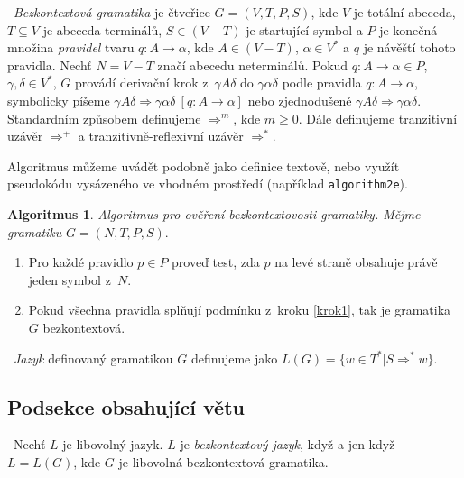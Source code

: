 \documentclass[a4paper,11pt,twocolumn]{article}[2014-03-27]
\begin{document}
\begin{definice} \label{definice1.1} \  \emph{Bezkontextová gramatika} je čtveřice $G=(V,T,P,S)$, kde $V$ je totální abeceda, $T \subseteq V$ je abeceda terminálů, $S \in (V-T)$ je startující symbol a $P$ je konečná množina \emph{pravidel}
tvaru $q\colon A \rightarrow \alpha$, kde $A \in (V - T) $, $\alpha \in V^*$ a $q$ je návěští tohoto pravidla. Nechť $N = V - T$ značí abecedu neterminálů.
Pokud $q\colon A \rightarrow \alpha \in P$, $\gamma, \delta \in V^*$, $G$ provádí derivační krok z~$\gamma A \delta$ do $\gamma \alpha \delta$ podle pravidla $q\colon A \rightarrow \alpha$, symbolicky píšeme $\gamma A \delta \Rightarrow \gamma \alpha \delta \ [q\colon A \rightarrow \alpha]$ nebo zjednodušeně $\gamma A \delta \Rightarrow \gamma \alpha \delta$. Standardním způsobem definujeme $\Rightarrow^m$, kde $m \geq 0 $. Dále definujeme
tranzitivní uzávěr $\Rightarrow^+$ a tranzitivně-reflexivní uzávěr $\Rightarrow^*$.
\end{definice}

Algoritmus můžeme uvádět podobně jako definice textově, nebo využít pseudokódu vysázeného ve vhodném prostředí (například \texttt{algorithm2e}).

\theoremstyle{definition}
\newtheorem{algoritmus}[definice]{Algoritmus}

\begin{algoritmus}
\textit{Algoritmus pro ověření bezkontextovosti gramatiky. Mějme gramatiku} $G = (N, T, P, S)$.
\begin{enumerate}
\itshape \item \label{krok1} Pro každé pravidlo $p \in P$ proveď test, zda $p$ na levé straně obsahuje právě jeden symbol z~$N$.
\itshape \item Pokud všechna pravidla splňují podmínku z~kroku \ref{krok1}, tak je gramatika $G$ bezkontextová.
\end{enumerate}
\end{algoritmus}

\begin{definice}\  \emph{Jazyk} definovaný gramatikou $G$ definujeme jako $L(G) = \{w \in T^*|S \Rightarrow^* w \}$.
\end{definice}


\subsection{Podsekce obsahující větu}
\begin{definice}\  Nechť $L$ je libovolný jazyk. $L$ je \emph{bezkontextový jazyk}, když a jen když $L = L(G)$, kde $G$ je libovolná bezkontextová gramatika.
\end{definice}
\end{document}
